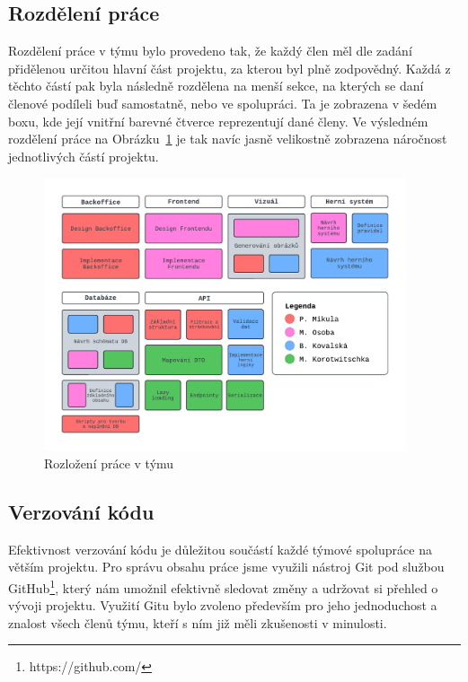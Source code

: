 \subsection{Rozdělení práce}
\label{subsec:implementation-collaboration-distribution}
Rozdělení práce v týmu bylo provedeno tak, že každý člen měl dle zadání přidělenou určitou hlavní část projektu, za kterou byl plně zodpovědný. Každá z těchto částí pak byla následně rozdělena na menší sekce, na kterých se daní členové podíleli buď samostatně, nebo ve spolupráci. Ta je zobrazena v šedém boxu, kde její vnitřní barevné čtverce reprezentují dané členy. Ve výsledném rozdělení práce na Obrázku~\ref{fig:job_distribution} je tak navíc jasně velikostně zobrazena náročnost jednotlivých částí projektu.

\begin{figure}[H]
    \centering
    \includegraphics[width=0.95\textwidth]{../../shared/diagrams/blocks}
    \caption{Rozložení práce v týmu}
    \label{fig:job_distribution}
\end{figure}

\subsection{Verzování kódu}
\label{subsec:implementation-collaboration-versioning}
Efektivnost verzování kódu je důležitou součástí každé týmové spolupráce na větším projektu. Pro správu obsahu práce jsme využili nástroj Git pod službou GitHub\footnote{https://github.com/}, který nám umožnil efektivně sledovat změny a udržovat si přehled o vývoji projektu. Využití Gitu bylo zvoleno především pro jeho jednoduchost a znalost všech členů týmu, kteří s ním již měli zkušenosti v minulosti.

